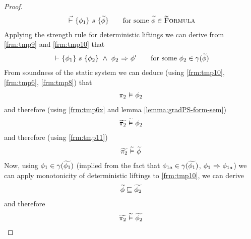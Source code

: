 \begin{proof}
        \begin{align}
        \label{frm:tmp10}
        {} \,\,\vec{\vdash}\,\, \{{\phi_1}\} ~{s}~ \{{\widetilde{\phi}}\}
        \quad\quad\text{for some } \widetilde{\phi} \in \textup{\textsc{\ensuremath{\widetilde{\text{F}}}ormula}}
        \end{align}
        Applying the strength rule for deterministic liftings we can derive from \ref{frm:tmp9} and \ref{frm:tmp10} that
        \begin{align}
        \label{frm:tmp11}
        {} \,\,{\vdash}\,\, \{{\phi_1}\} ~{s}~ \{{\phi_2}\} ~\wedge~ {\phi_2} \,\,{\Rightarrow}\,\, {\phi'}
        \quad\quad\text{for some } \phi_2 \in \gamma(\widetilde{\phi})
        \end{align}
        From soundness of the static system we can deduce (using \ref{frm:tmp10}, \ref{frm:tmp6}, \ref{frm:tmp8}) that
        \begin{align}
        \label{frm:tmp12}
        \pi_2 \,\,{\vDash}\,\, \phi_2
        \end{align}
        and therefore (using \ref{frm:tmp6x} and lemma \ref{lemma:gradPS-form-sem})
        \begin{align}
        \label{frm:tmp14}
        \widetilde{\pi_2} \,\,\widetilde{\vDash}\,\, \phi_2
        \end{align}
        and therefore (using \ref{frm:tmp11})
        \begin{align}
        \label{frm:tmp13}
        \widetilde{\pi_2} \,\,\widetilde{\vDash}\,\, \widetilde{\phi}
        \end{align}
        Now, using $\phi_1 \in \gamma(\widetilde{\phi_1})$ (implied from the fact that $\phi_{1a} \in \gamma(\widetilde{\phi_1})$, ${\phi_1} \,\,{\Rightarrow}\,\, {\phi_{1a}}$) we can apply monotonicity of deterministic liftings to \ref{frm:tmp10}, we can derive
        \begin{align}
        \label{frm:tmp15}
        \widetilde{\phi} \sqsubseteq \widetilde{\phi_2}
        \end{align}
        and therefore
        \begin{align}
        \label{frm:tmp16}
        \widetilde{\pi_2} \,\,\widetilde{\vDash}\,\, \widetilde{\phi_2}
        \end{align}
\end{proof}